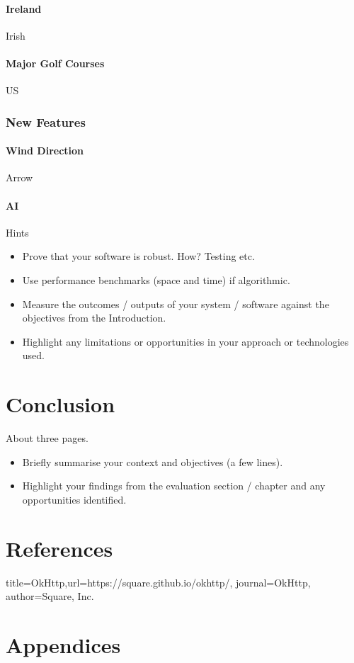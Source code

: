 \subsubsection{Ireland}
Irish
\subsubsection{Major Golf Courses}
US
\subsection{New Features}
\subsubsection{Wind Direction}
Arrow
\subsubsection{AI}
Hints
\begin{itemize}
\item Prove that your software is robust. How? Testing etc.
\item Use performance benchmarks (space and time) if algorithmic.
\item Measure the outcomes / outputs of your system / software against the objectives from the Introduction.
\item Highlight any limitations or opportunities in your approach or technologies used.
\end{itemize}
\chapter{Conclusion}
About three pages.
\begin{itemize}
\item Briefly summarise your context and objectives (a few lines).
\item Highlight your findings from the evaluation section / chapter and any opportunities identified.
\end{itemize}
\chapter{References}

\begin{thebibliography}{9}
 {title={OkHttp},url={https://square.github.io/okhttp/}, journal={OkHttp}, author={Square, Inc.}}

\end{thebibliography}
\chapter{Appendices}
